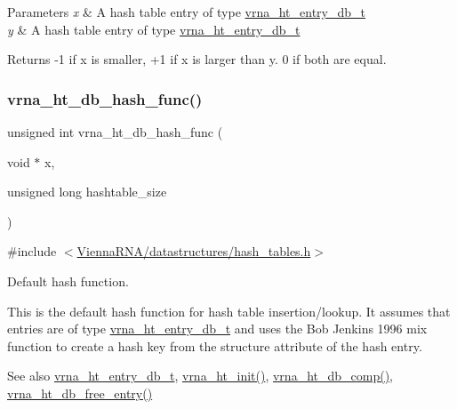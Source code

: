 \begin{DoxyParams}{Parameters}
{\em x} & A hash table entry of type \hyperlink{group__hash__table__utils_structvrna__ht__entry__db__t}{vrna\+\_\+ht\+\_\+entry\+\_\+db\+\_\+t} \\
\hline
{\em y} & A hash table entry of type \hyperlink{group__hash__table__utils_structvrna__ht__entry__db__t}{vrna\+\_\+ht\+\_\+entry\+\_\+db\+\_\+t} \\
\hline
\end{DoxyParams}
\begin{DoxyReturn}{Returns}
-\/1 if x is smaller, +1 if x is larger than y. 0 if both are equal. 
\end{DoxyReturn}
\mbox{\label{group__hash__table__utils_gad133721a3cd2f8ca259fe315d86035a7}} 
\subsubsection{\texorpdfstring{vrna\+\_\+ht\+\_\+db\+\_\+hash\+\_\+func()}{vrna\_ht\_db\_hash\_func()}}
{\footnotesize\ttfamily unsigned int vrna\+\_\+ht\+\_\+db\+\_\+hash\+\_\+func (\begin{DoxyParamCaption}\item[{void $\ast$}]{x,  }\item[{unsigned long}]{hashtable\+\_\+size }\end{DoxyParamCaption})}



{\ttfamily \#include $<$\hyperlink{hash__tables_8h}{Vienna\+R\+N\+A/datastructures/hash\+\_\+tables.\+h}$>$}



Default hash function. 

This is the default hash function for hash table insertion/lookup. It assumes that entries are of type \hyperlink{group__hash__table__utils_structvrna__ht__entry__db__t}{vrna\+\_\+ht\+\_\+entry\+\_\+db\+\_\+t} and uses the Bob Jenkins 1996 mix function to create a hash key from the {\ttfamily structure} attribute of the hash entry.

\begin{DoxySeeAlso}{See also}
\hyperlink{group__hash__table__utils_structvrna__ht__entry__db__t}{vrna\+\_\+ht\+\_\+entry\+\_\+db\+\_\+t}, \hyperlink{group__hash__table__utils_ga37d1c7e13087a2b7c1b87fda34577c29}{vrna\+\_\+ht\+\_\+init()}, \hyperlink{group__hash__table__utils_gac4ec0b8372d50d7347a63f140f340962}{vrna\+\_\+ht\+\_\+db\+\_\+comp()}, \hyperlink{group__hash__table__utils_gabcdcd0d070b3dfd2634a09e7838acf66}{vrna\+\_\+ht\+\_\+db\+\_\+free\+\_\+entry()}
\end{DoxySeeAlso}

